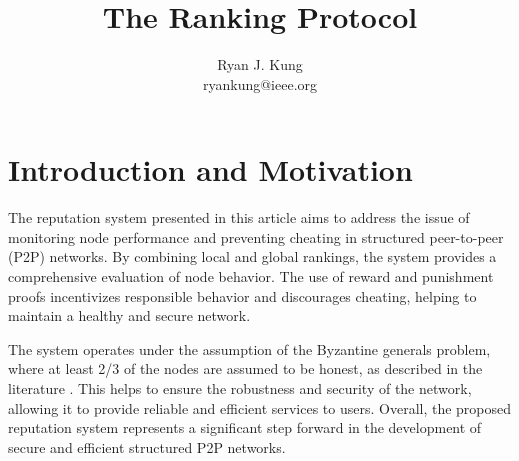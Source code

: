 \documentclass[twocolumn]{article}
\author{
  Ryan J. Kung \\ ryankung@ieee.org
}
\title{The Ranking Protocol}
\begin{document}

\section{Introduction and Motivation}
The reputation system presented in this article aims to address the issue of monitoring node performance and preventing cheating in structured peer-to-peer (P2P) networks. By combining local and global rankings, the system provides a comprehensive evaluation of node behavior. The use of reward and punishment proofs incentivizes responsible behavior and discourages cheating, helping to maintain a healthy and secure network.

The system operates under the assumption of the Byzantine generals problem, where at least 2/3 of the nodes are assumed to be honest, as described in the literature \cite{time}. This helps to ensure the robustness and security of the network, allowing it to provide reliable and efficient services to users. Overall, the proposed reputation system represents a significant step forward in the development of secure and efficient structured P2P networks.
\end{document}

